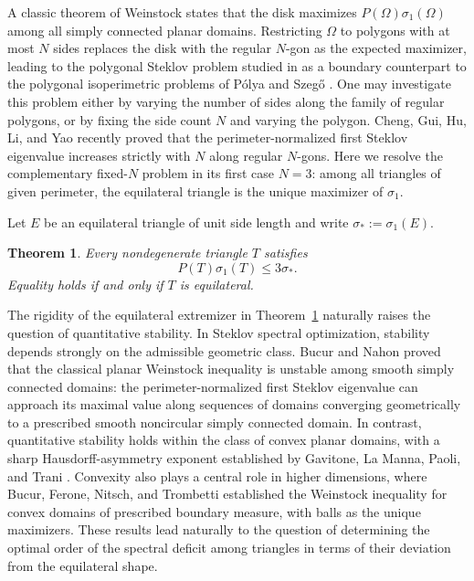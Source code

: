 \documentclass[11pt,reqno]{amsart}
\numberwithin{equation}{section}
\newtheorem{theorem}{Theorem}[section]
\theoremstyle{remark}
\begin{document}
A classic theorem of Weinstock \cite{Weinstock} states that the disk
maximizes $P(\Omega)\sigma_1(\Omega)$ among all simply connected planar domains. Restricting $\Omega$ to polygons with at most $N$ sides replaces the disk with the regular $N$-gon as the expected maximizer, leading to the polygonal Steklov problem studied in \cite{CGHLY} as a boundary counterpart to the polygonal isoperimetric problems of P\'olya and Szeg\H{o} \cite{PS,Henrot}. One may investigate this problem either by varying the number of sides along the family of regular polygons, or by fixing the side count $N$ and varying the polygon. Cheng, Gui, Hu, Li, and Yao \cite{CGHLY} recently proved that the perimeter-normalized first Steklov eigenvalue increases strictly with $N$ along regular $N$-gons. Here we resolve the complementary fixed-$N$ problem in its first case $N=3$: among all triangles of given perimeter, the equilateral triangle is the unique maximizer of $\sigma_1$.

Let $E$ be an equilateral triangle of unit side length and write
$\sigma_*:=\sigma_1(E)$.
\begin{theorem}\label{thm:main}
Every nondegenerate triangle $T$ satisfies
\begin{equation}\label{eq:main}
 P(T)\sigma_1(T)\le 3\sigma_*.
\end{equation}
Equality holds if and only if $T$ is equilateral.
\end{theorem}

The rigidity of the equilateral extremizer in Theorem~\ref{thm:main} naturally raises the question of quantitative stability. In Steklov spectral optimization, stability depends strongly on the admissible geometric class. Bucur and Nahon \cite{BN} proved that the classical planar Weinstock inequality is unstable among smooth simply connected domains: the perimeter-normalized first Steklov eigenvalue can approach its maximal value along sequences of domains converging geometrically to a prescribed smooth noncircular simply connected domain. In contrast, quantitative stability holds within the class of convex planar domains, with a sharp Hausdorff-asymmetry exponent established by Gavitone, La Manna, Paoli, and Trani \cite{GLPT}. Convexity also plays a central role in higher dimensions, where Bucur, Ferone, Nitsch, and Trombetti \cite{BFNT} established the Weinstock inequality for convex domains of prescribed boundary measure, with balls as the unique maximizers. These results lead naturally to the question of determining the optimal order of the spectral deficit among triangles in terms of their deviation from the equilateral shape.
\end{document}
